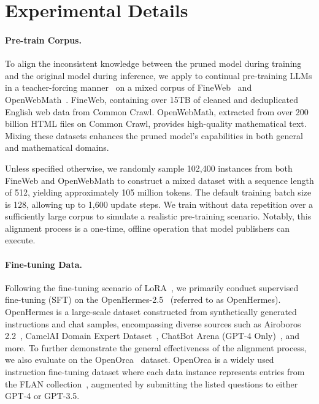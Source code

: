 \section{Experimental Details}
\label{apd:detail_setup}
\paragraph{Pre-train Corpus.}
To align the inconsistent knowledge between the pruned model during training and the original model during inference, we apply \method to continual pre-training 
LLMs in a teacher-forcing manner~\citep{bachmann2024teacherforce}
on a mixed corpus of FineWeb~\citep{penedo2024fineweb} and OpenWebMath~\citep{paster2023openwebmath}.
FineWeb, containing over 15TB of cleaned and deduplicated English web data from Common Crawl. 
OpenWebMath, extracted from over 200 billion HTML files on Common Crawl, provides high-quality mathematical text. Mixing these datasets enhances the pruned model's capabilities in both general and mathematical domains.

Unless specified otherwise, we randomly sample 102,400 instances from both FineWeb and OpenWebMath to construct a mixed dataset with a sequence length of 512, yielding approximately 105 million tokens. The default training batch size is 128, allowing up to 1,600 update steps. We train without data repetition over a sufficiently large corpus to simulate a realistic pre-training scenario. 
Notably, this alignment process is a one-time, offline operation that model publishers can execute.

\paragraph{Fine-tuning Data.}
Following the fine-tuning scenario of LoRA~\citep{Edw:2022lora}, we primarily conduct supervised fine-tuning (SFT) on the OpenHermes-2.5~\citep{OpenHermes} (referred to as OpenHermes). OpenHermes is a large-scale dataset constructed from synthetically generated instructions and chat samples, encompassing diverse sources such as Airoboros 2.2~\citep{wang2023selfinstructaligning}, CamelAI Domain Expert Dataset~\citep{li2023camel}, ChatBot Arena (GPT-4 Only)~\citep{zheng2023lmsyschat1m}, and more.
To further demonstrate the general effectiveness of the \method alignment process, we also evaluate \method on the OpenOrca~\citep{OpenOrca} dataset. OpenOrca is a widely used instruction fine-tuning dataset where each data instance represents entries from the FLAN collection~\citep{longpre2023flan}, augmented by submitting the listed questions to either GPT-4 or GPT-3.5.

